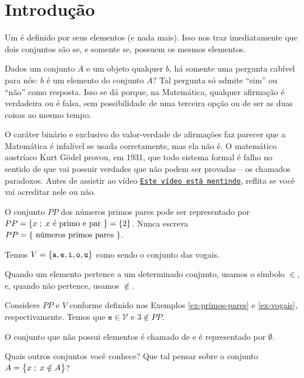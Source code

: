 \section{Introdução}
Um  é definido por seus elementos (e nada mais). Isso nos traz imediatamente que dois conjuntos são  se, e somente se, possuem os mesmos elementos.

Dados um conjunto $A$ e um objeto qualquer $b$, há somente uma pergunta cabível para nós: $b$ é um elemento do conjunto $A$? Tal pergunta só admite ``sim'' ou ``não'' como resposta. Isso se dá porque, na Matemática, qualquer afirmação é verdadeira ou é falsa, sem possibilidade de uma terceira opção ou de ser as duas coisas ao mesmo tempo. 

O caráter binário e exclusivo do valor-verdade de afirmações faz parecer que a Matemática é infalível se usada corretamente, mas ela não é. O matemático austríaco Kurt Gödel provou, em 1931, que todo sistema formal é falho no sentido de que vai possuir verdades que não podem ser provadas -- os chamados paradoxos. Antes de assistir ao vídeo \href{https://youtu.be/UI1xR_AECrU}{{\tt Este vídeo está mentindo}}, reflita se você vai acreditar nele ou não.

\begin{example}
\label{ex-primos-pares}
O conjunto $PP$ dos números primos pares pode ser representado por $PP = \left\{x \;;\; x \text{ é primo e par }\right\} = \left\{2\right\}$. Nunca escreva $PP = \left\{\text{ números primos pares }\right\}$.
\end{example}

\begin{example}
\label{ex-vogais}
Temos $V=\left\{\texttt{a}, \texttt{e}, \texttt{i}, \texttt{o}, \texttt{u}\right\}$ como sendo o conjunto das vogais.
\end{example}

\begin{remark}
Quando um elemento pertence a um determinado conjunto, usamos o símbolo $\in$, e, quando não pertence, usamos $\notin$.
\end{remark}

\begin{example}
Considere $PP$ e $V$ conforme definido nos Exemplos \ref{ex-primos-pares} e \ref{ex-vogais}, respectivamente. Temos que $\texttt{e} \in \mathcal{V}$ e $3 \notin PP$.
\end{example}

\begin{definition}
O conjunto que não possui elementos é chamado de  e é representado por $\emptyset$.
\end{definition}

\begin{example}
Quais outros conjuntos você conhece? Que tal pensar sobre o conjunto $A = \left\{x \;;\; x \notin A\right\}$?
\end{example}
